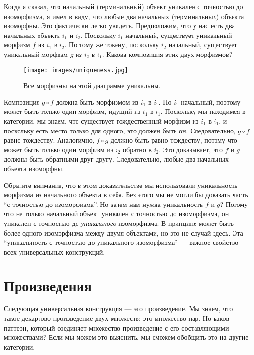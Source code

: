 Когда я сказал, что начальный (терминальный) объект уникален с точностью до
изоморфизма, я имел в виду, что любые два начальных (терминальных) объекта
изоморфны. Это фактически легко увидеть. Предположим, что у нас есть два
начальных объекта $i_{1}$ и $i_{2}$. Поскольку
$i_{1}$ начальный, существует уникальный морфизм $f$ из
$i_{1}$ в $i_{2}$. По тому же токену, поскольку
$i_{2}$ начальный, существует уникальный морфизм $g$ из
$i_{2}$ в $i_{1}$. Какова композиция
этих двух морфизмов?

\begin{figure}[H]
  \centering
  \texttt{[image: images/uniqueness.jpg]}
  \caption{Все морфизмы на этой диаграмме уникальны.}
\end{figure}

\noindent
Композиция $g \circ f$ должна быть морфизмом из $i_{1}$ в
$i_{1}$. Но $i_{1}$ начальный, поэтому может быть только
один морфизм, идущий из $i_{1}$ в $i_{1}$.
Поскольку мы находимся в категории, мы знаем, что существует тождественный морфизм
из $i_{1}$ в $i_{1}$, и поскольку есть место
только для одного, это должен быть он. Следовательно, $g \circ f$ равно
тождеству. Аналогично, $f \circ g$ должно быть равно тождеству, потому что может
быть только один морфизм из $i_{2}$ обратно в
$i_{2}$. Это доказывает, что $f$ и $g$ должны быть
обратными друг другу. Следовательно, любые два начальных объекта изоморфны.

Обратите внимание, что в этом доказательстве мы использовали уникальность морфизма из
начального объекта в себя. Без этого мы не могли бы доказать часть ``с точностью до
изоморфизма''. Но зачем нам нужна уникальность $f$ и
$g$? Потому что не только начальный объект уникален с точностью до
изоморфизма, он уникален с точностью до \emph{уникального} изоморфизма. В принципе
может быть более одного изоморфизма между двумя объектами, но это не
случай здесь. Эта ``уникальность с точностью до уникального изоморфизма'' ---
важное свойство всех универсальных конструкций.

\section{Произведения}

Следующая универсальная конструкция --- это произведение. Мы знаем, что такое
декартово произведение двух множеств: это множество пар. Но каков
паттерн, который соединяет множество-произведение с его составляющими множествами? Если мы
можем это выяснить, мы сможем обобщить это на другие категории.

